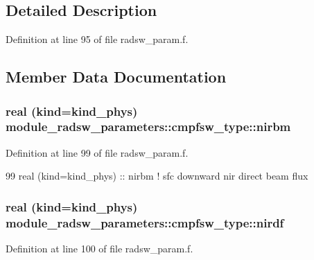 \subsection{Detailed Description}


Definition at line 95 of file radsw\+\_\+param.\+f.



\subsection{Member Data Documentation}
\subsubsection[{\texorpdfstring{nirbm}{nirbm}}]{\setlength{\rightskip}{0pt plus 5cm}real (kind=kind\+\_\+phys) module\+\_\+radsw\+\_\+parameters\+::cmpfsw\+\_\+type\+::nirbm}\hypertarget{structmodule__radsw__parameters_1_1cmpfsw__type_aae8070f9f477bf036071ccc7d707693d}{}\label{structmodule__radsw__parameters_1_1cmpfsw__type_aae8070f9f477bf036071ccc7d707693d}


Definition at line 99 of file radsw\+\_\+param.\+f.


\begin{DoxyCode}
99         \textcolor{keywordtype}{real (kind=kind\_phys)} :: nirbm         \textcolor{comment}{! sfc downward nir direct beam flux}
\end{DoxyCode}
\subsubsection[{\texorpdfstring{nirdf}{nirdf}}]{\setlength{\rightskip}{0pt plus 5cm}real (kind=kind\+\_\+phys) module\+\_\+radsw\+\_\+parameters\+::cmpfsw\+\_\+type\+::nirdf}\hypertarget{structmodule__radsw__parameters_1_1cmpfsw__type_a9944f87ce40eb678e3ca1d88b1dbb797}{}\label{structmodule__radsw__parameters_1_1cmpfsw__type_a9944f87ce40eb678e3ca1d88b1dbb797}


Definition at line 100 of file radsw\+\_\+param.\+f.


